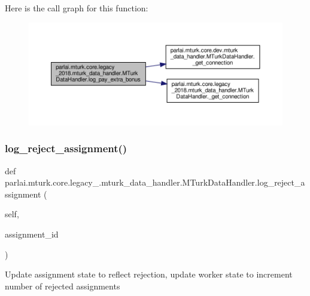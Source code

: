 Here is the call graph for this function\+:
\nopagebreak
\begin{figure}[H]
\begin{center}
\leavevmode
\includegraphics[width=350pt]{classparlai_1_1mturk_1_1core_1_1legacy__2018_1_1mturk__data__handler_1_1MTurkDataHandler_a86266f696dc415742c4d1709568a52ff_cgraph}
\end{center}
\end{figure}
\mbox{\label{classparlai_1_1mturk_1_1core_1_1legacy__2018_1_1mturk__data__handler_1_1MTurkDataHandler_ac2e8b6d462a8ce16509ac25fff7f8c24}} 
\subsubsection{\texorpdfstring{log\+\_\+reject\+\_\+assignment()}{log\_reject\_assignment()}}
{\footnotesize\ttfamily def parlai.\+mturk.\+core.\+legacy\+\_.\+mturk\+\_\+data\+\_\+handler.\+M\+Turk\+Data\+Handler.\+log\+\_\+reject\+\_\+assignment (\begin{DoxyParamCaption}\item[{}]{self,  }\item[{}]{assignment\+\_\+id }\end{DoxyParamCaption})}

\begin{DoxyVerb}Update assignment state to reflect rejection, update worker state to
increment number of rejected assignments
\end{DoxyVerb}
 

